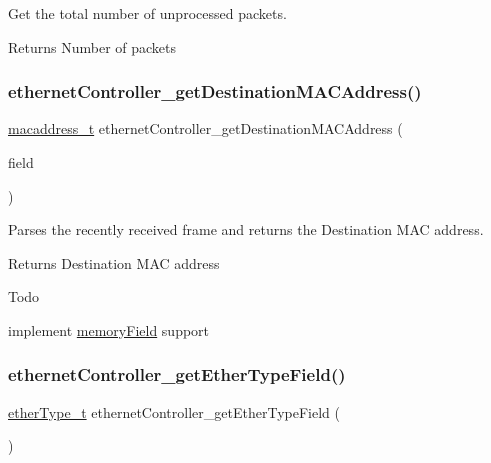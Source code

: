 Get the total number of unprocessed packets. 

\begin{DoxyReturn}{Returns}
Number of packets 
\end{DoxyReturn}
\mbox{\label{group__data__reception_ga29e5c29891e62206ceed99a6b15749a0}} 
\subsubsection{\texorpdfstring{ethernetController\_getDestinationMACAddress()}{ethernetController\_getDestinationMACAddress()}}
{\footnotesize\ttfamily \mbox{\hyperlink{group__ethernet_gacb865bcbf50a6c8cef05581bfabff373}{macaddress\+\_\+t}} ethernet\+Controller\+\_\+get\+Destination\+M\+A\+C\+Address (\begin{DoxyParamCaption}\item[{\mbox{\hyperlink{group__memory_ga1d04d80fae40964f55d2df46b5d64785}{memory\+Field\+\_\+t}}}]{field }\end{DoxyParamCaption})}



Parses the recently received frame and returns the Destination M\+AC address. 

\begin{DoxyReturn}{Returns}
Destination M\+AC address 
\end{DoxyReturn}
\begin{DoxyRefDesc}{Todo}
\item[\mbox{\hyperlink{todo__todo000010}{Todo}}]implement \mbox{\hyperlink{structmemory_field}{memory\+Field}} support \end{DoxyRefDesc}
\mbox{\label{group__data__reception_gae806930e1cc431f556f805fe1aef6355}} 
\subsubsection{\texorpdfstring{ethernetController\_getEtherTypeField()}{ethernetController\_getEtherTypeField()}}
{\footnotesize\ttfamily \mbox{\hyperlink{group__ethernet_ga467703afefdcaf7893a7da3eb63280ed}{ether\+Type\+\_\+t}} ethernet\+Controller\+\_\+get\+Ether\+Type\+Field (\begin{DoxyParamCaption}{ }\end{DoxyParamCaption})}




